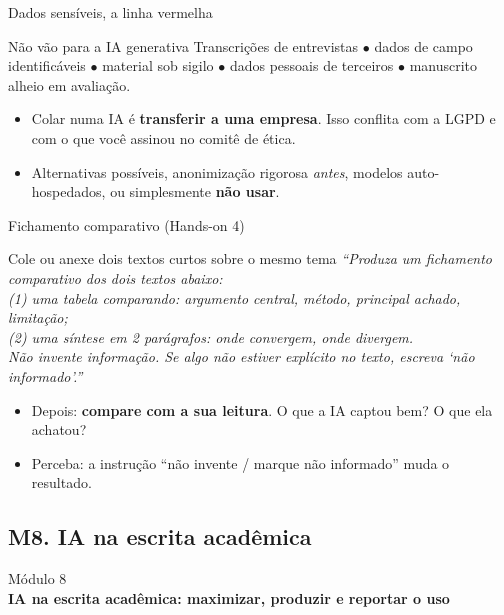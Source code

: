 \documentclass[11pt,aspectratio=169,t]{beamer}
\newcommand{\transicao}[2]{%
  \begin{frame}[plain]
    \centering
    \vspace*{2.2cm}
    {\large\color{cinzaescuro} #1}\\[0.8cm]
    {\Large\color{azulUNI}\textbf{#2}}
  \end{frame}}
\begin{document}
\begin{frame}{Dados sensíveis, a linha vermelha}
  \begin{alertblock}{Não vão para a IA generativa}
    Transcrições de entrevistas $\bullet$ dados de campo identificáveis $\bullet$ material sob sigilo $\bullet$ dados pessoais de terceiros $\bullet$ manuscrito alheio em avaliação.
  \end{alertblock}
  \pause
  \vfill
  \begin{itemize}
    \item Colar numa IA é \textbf{transferir a uma empresa}. Isso conflita com a LGPD e com o que você assinou no comitê de ética.
    \pause
    \item Alternativas possíveis, anonimização rigorosa \textit{antes}, modelos auto-hospedados, ou simplesmente \textbf{não usar}.
  \end{itemize}
\end{frame}

\begin{frame}{Fichamento comparativo (Hands-on 4)}
  \begin{exampleblock}{Cole ou anexe dois textos curtos sobre o mesmo tema}
    \small
    \textit{``Produza um fichamento comparativo dos dois textos abaixo:\\
    (1) uma tabela comparando: argumento central, método, principal achado, limitação;\\
    (2) uma síntese em 2 parágrafos: onde convergem, onde divergem.\\
    Não invente informação. Se algo não estiver explícito no texto, escreva `não informado'.''}
  \end{exampleblock}
  \vfill
  \begin{itemize}
    \item Depois: \textbf{compare com a sua leitura}. O que a IA captou bem? O que ela achatou?
    \item Perceba: a instrução ``não invente / marque não informado'' muda o resultado.
  \end{itemize}
\end{frame}

\subsection{M8. IA na escrita acadêmica}
\transicao{Módulo 8}{IA na escrita acadêmica: maximizar, produzir e reportar o uso}
\end{document}
